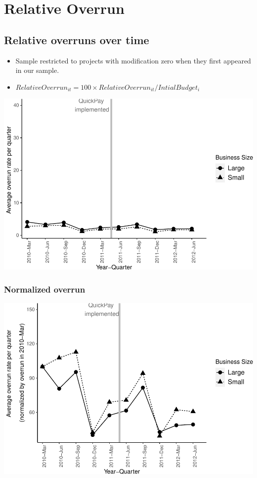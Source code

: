 \documentclass[
]{article}
\begin{document}
\hypertarget{relative-overrun}{%
\section{Relative Overrun}\label{relative-overrun}}

\hypertarget{relative-overruns-over-time}{%
\subsection{Relative overruns over
time}\label{relative-overruns-over-time}}

\begin{itemize}
\item
  Sample restricted to projects with modification zero when they first
  appeared in our sample.
\item
  \(RelativeOverrun_{it} = 100 \times RelativeOverrun_{it}/IntialBudget_i\)
\end{itemize}

\includegraphics{qp_first_budget_overrun_mod_zero_files/figure-latex/plot_relative_overrun-1.pdf}

\hypertarget{normalized-overrun-2}{%
\subsubsection{Normalized overrun}\label{normalized-overrun-2}}

\includegraphics{qp_first_budget_overrun_mod_zero_files/figure-latex/normalized_relative_plot-1.pdf}
\end{document}
